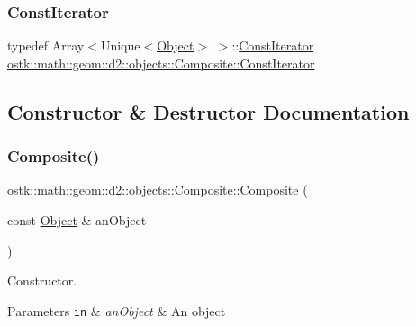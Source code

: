 \subsubsection{\texorpdfstring{Const\+Iterator}{ConstIterator}}
{\footnotesize\ttfamily typedef Array$<$Unique$<$\hyperlink{classostk_1_1math_1_1geom_1_1d2_1_1_object}{Object}$>$ $>$\+::\hyperlink{classostk_1_1math_1_1geom_1_1d2_1_1objects_1_1_composite_a848b806da9977737e1b100c1b51b39d9}{Const\+Iterator} \hyperlink{classostk_1_1math_1_1geom_1_1d2_1_1objects_1_1_composite_a848b806da9977737e1b100c1b51b39d9}{ostk\+::math\+::geom\+::d2\+::objects\+::\+Composite\+::\+Const\+Iterator}}



\subsection{Constructor \& Destructor Documentation}
\mbox{\label{classostk_1_1math_1_1geom_1_1d2_1_1objects_1_1_composite_ad05d10b391609de957f14ab9db998991}} 
\subsubsection{\texorpdfstring{Composite()}{Composite()}\hspace{0.1cm}{\footnotesize\ttfamily [1/4]}}
{\footnotesize\ttfamily ostk\+::math\+::geom\+::d2\+::objects\+::\+Composite\+::\+Composite (\begin{DoxyParamCaption}\item[{const \hyperlink{classostk_1_1math_1_1geom_1_1d2_1_1_object}{Object} \&}]{an\+Object }\end{DoxyParamCaption})\hspace{0.3cm}{\ttfamily [explicit]}}



Constructor. 


\begin{DoxyParams}[1]{Parameters}
\mbox{\tt in}  & {\em an\+Object} & An object \\
\hline
\end{DoxyParams}
\mbox{\label{classostk_1_1math_1_1geom_1_1d2_1_1objects_1_1_composite_a52e7aa8b9abdd38c1eb71d36cc9fb18c}} 
